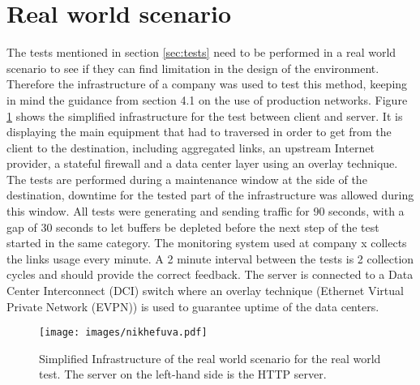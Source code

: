 \section{Real world scenario}
The tests mentioned in section \ref{sec:tests} need to be performed in a real world scenario to see if they can find limitation in the design of the environment. 
Therefore the infrastructure of a company was used to test this method, keeping in mind the guidance from section 4.1 on the use of production networks.
Figure \ref{fig:nikhefuva} shows the simplified infrastructure for the test between client and server.
It is displaying the main equipment that had to traversed in order to get from the client to the destination, including aggregated links, an upstream Internet provider, a stateful firewall and a data center layer using an overlay technique.  
The tests are performed during a maintenance window at the side of the destination, downtime for the tested part of the infrastructure was allowed during this window. 
All tests were generating and sending traffic for 90 seconds, with a gap of 30 seconds to let buffers be depleted before the next step of the test started in the same category.
The monitoring system used at company x collects the links usage every minute. A 2 minute interval between the tests is 2 collection cycles and should provide the correct feedback. 
The server is connected to a Data Center Interconnect (DCI) switch where an overlay technique (Ethernet Virtual Private Network (EVPN)) is used to guarantee uptime of the data centers. 

\begin{figure}
  \texttt{[image: images/nikhefuva.pdf]}
  \caption{Simplified Infrastructure of the real world scenario for the real world test. The server on the left-hand side is the HTTP server.}
  \label{fig:nikhefuva}
\end{figure}

